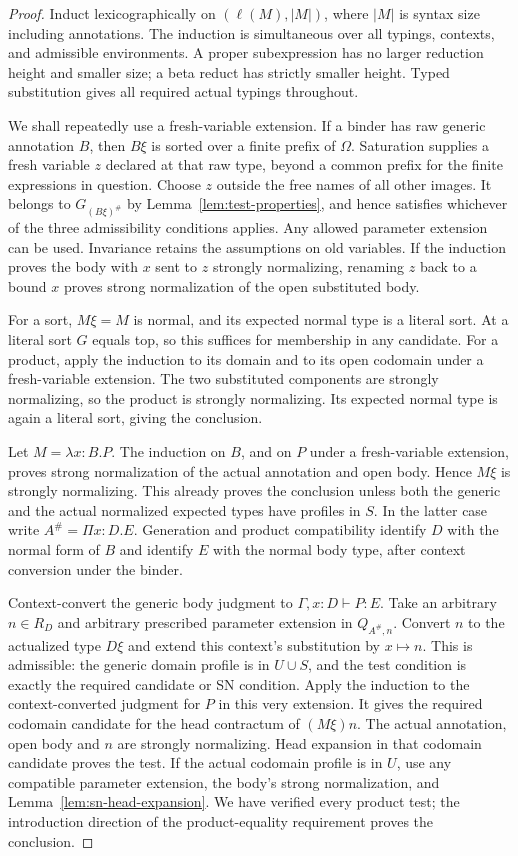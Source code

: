 \begin{proof}
Induct lexicographically on $(\ell(M),|M|)$, where $|M|$ is syntax
size including annotations. The induction is simultaneous over all
typings, contexts, and admissible environments. A proper subexpression
has no larger reduction height and smaller size; a beta reduct has
strictly smaller height. Typed substitution gives all required actual
typings throughout.

We shall repeatedly use a fresh-variable extension. If a binder has
raw generic annotation $B$, then $B\xi$ is sorted over a finite
prefix of $\Omega$. Saturation supplies a fresh variable $z$ declared
at that raw type, beyond a common prefix for the finite expressions
in question. Choose $z$ outside the free names of all other images.
It belongs to $G_{(B\xi)^\#}$ by
Lemma~\ref{lem:test-properties}, and hence satisfies whichever of
the three admissibility conditions applies. Any allowed parameter
extension can be used. Invariance retains the assumptions on old
variables. If the induction proves the body with $x$ sent to $z$
strongly normalizing, renaming $z$ back to a bound $x$ proves strong
normalization of the open substituted body.

For a sort, $M\xi=M$ is normal, and its expected normal type is a
literal sort. At a literal sort $G$ equals top, so this suffices for
membership in any candidate. For a product, apply the induction to
its domain and to its open codomain under a fresh-variable extension.
The two substituted components are strongly normalizing, so the
product is strongly normalizing. Its expected normal type is again
a literal sort, giving the conclusion.

Let $M=\lambda x:B.P$. The induction on $B$, and on $P$ under a
fresh-variable extension, proves strong normalization of the actual
annotation and open body. Hence $M\xi$ is strongly normalizing.
This already proves the conclusion unless both the generic and the
actual normalized expected types have profiles in $S$. In the latter
case write $A^\#=\Pi x:D.E$. Generation and product compatibility
identify $D$ with the normal form of $B$ and identify $E$ with the
normal body type, after context conversion under the binder.

Context-convert the generic body judgment to
$\Gamma,x:D\vdash P:E$. Take an arbitrary $n\in R_D$ and arbitrary
prescribed parameter extension in $Q_{A^\#,n}$. Convert $n$ to the
actualized type $D\xi$ and extend this context's substitution by
$x\mapsto n$. This is admissible:
the generic domain profile is in $U\cup S$, and the test condition is
exactly the required candidate or SN condition. Apply the induction
to the context-converted judgment for $P$ in this very extension.
It gives the required codomain candidate for the head contractum of
$(M\xi)n$. The actual annotation, open body and $n$ are strongly
normalizing. Head expansion in that codomain candidate proves the
test. If the actual codomain profile is in $U$, use any compatible
parameter extension, the body's strong normalization, and
Lemma~\ref{lem:sn-head-expansion}. We have verified every product
test; the introduction direction of
the product-equality requirement proves the conclusion.


\end{proof}
